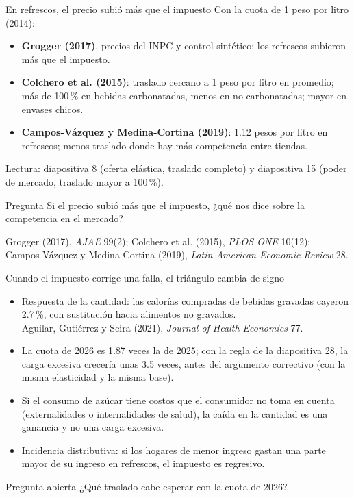\documentclass[aspectratio=169,11pt]{beamer}
\newcommand{\fuente}[1]{\par\vfill{\small\color{cGris}#1\par}}
\begin{document}
\begin{frame}{En refrescos, el precio subió más que el impuesto}
  \small
  Con la cuota de 1 peso por litro (2014):
  \begin{itemize}
    \item \textbf{Grogger (2017)}, precios del INPC y control sintético: los refrescos subieron más que el impuesto.
    \item \textbf{Colchero et al. (2015)}: traslado cercano a 1 peso por litro en promedio; más de 100\,\% en bebidas carbonatadas, menos en no carbonatadas; mayor en envases chicos.
    \item \textbf{Campos-Vázquez y Medina-Cortina (2019)}: 1.12 pesos por litro en refrescos; menos traslado donde hay más competencia entre tiendas.
  \end{itemize}
  \pause
  Lectura: diapositiva 8 (oferta elástica, traslado completo) y diapositiva 15 (poder de mercado, traslado mayor a 100\,\%).
  \pause
  \begin{alertblock}{Pregunta}
    Si el precio subió más que el impuesto, ¿qué nos dice sobre la competencia en el mercado?
  \end{alertblock}
  \fuente{Grogger (2017), \emph{AJAE} 99(2); Colchero et al. (2015), \emph{PLOS ONE} 10(12); Campos-Vázquez y Medina-Cortina (2019), \emph{Latin American Economic Review} 28.}
\end{frame}

\begin{frame}{Cuando el impuesto corrige una falla, el triángulo cambia de signo}
  \begin{itemize}
    \item Respuesta de la cantidad: las calorías compradas de bebidas gravadas cayeron 2.7\,\%, con sustitución hacia alimentos no gravados.\\
      {\small\color{cGris}Aguilar, Gutiérrez y Seira (2021), \emph{Journal of Health Economics} 77.}
    \pause
    \item La cuota de 2026 es 1.87 veces la de 2025; con la regla de la diapositiva 28, la carga excesiva crecería unas 3.5 veces, antes del argumento correctivo (con la misma elasticidad y la misma base).
    \pause
    \item Si el consumo de azúcar tiene costos que el consumidor no toma en cuenta (externalidades o internalidades de salud), la caída en la cantidad es una ganancia y no una carga excesiva.
    \pause
    \item Incidencia distributiva: si los hogares de menor ingreso gastan una parte mayor de su ingreso en refrescos, el impuesto es regresivo.
  \end{itemize}
  \pause
  \begin{block}{Pregunta abierta}
    ¿Qué traslado cabe esperar con la cuota de 2026?
  \end{block}
\end{frame}
\end{document}
